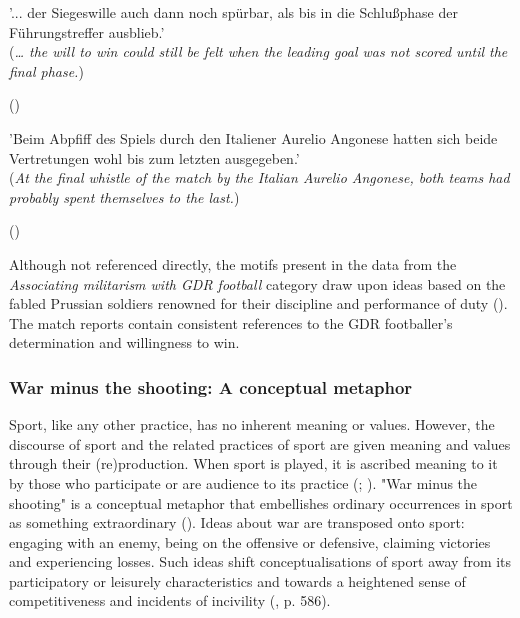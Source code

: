 \begin{displayquote}
\begin{small}
'... der Siegeswille auch dann noch spürbar, als bis in die Schlußphase der Führungstreffer ausblieb.'\\
(\textit{… the will to win could still be felt when the leading goal was not scored until the final phase.})\
\begin{flushright}\footnotesize (\cite{nd19740314})\end{flushright}
\end{small}
\end{displayquote}

\begin{displayquote}
\begin{small}
'Beim Abpfiff des Spiels durch den Italiener Aurelio Angonese hatten sich beide Vertretungen wohl bis zum letzten ausgegeben.'\\
(\textit{At the final whistle of the match by the Italian Aurelio Angonese, both teams had probably spent themselves to the last.})\
\begin{flushright}\footnotesize (\cite{nd19740619})\end{flushright}
\end{small}
\end{displayquote}

Although not referenced directly, the motifs present in the data from the \textit{Associating militarism with GDR football} category draw upon ideas based on the fabled Prussian soldiers renowned for their discipline and performance of duty (\cite{jackman2004}). The match reports contain consistent references to the GDR footballer’s determination and willingness to win.

\subsubsection*{War minus the shooting: A conceptual metaphor}

Sport, like any other practice, has no inherent meaning or values. However, the discourse of sport and the related practices of sport are given meaning and values through their (re)production. When sport is played, it is ascribed meaning to it by those who participate or are audience to its practice (\cite{crawford2004}; \cite{giulianotti2005}). "War minus the shooting" is a conceptual metaphor that embellishes ordinary occurrences in sport as something extraordinary (\cite{lakoffjohnson2003}). Ideas about war are transposed onto sport: engaging with an enemy, being on the offensive or defensive, claiming victories and experiencing losses. Such ideas shift conceptualisations of sport away from its participatory or leisurely characteristics and towards a heightened sense of competitiveness and incidents of incivility (\cite{murray2012}, p. 586).

